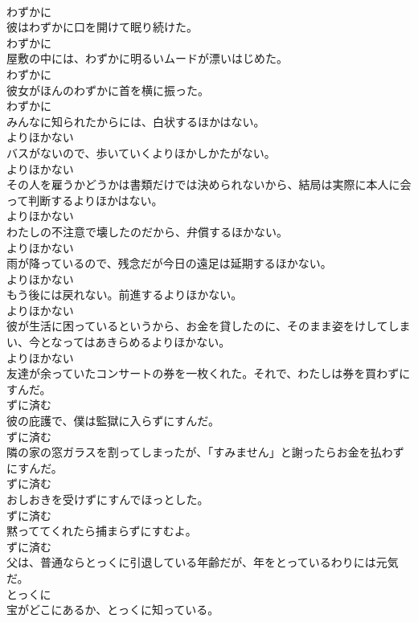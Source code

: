 \documentclass[8pt]{extreport}
\begin{document}
\begin{CJK}{UTF8}{min}
\\	わずかに
\\	彼はわずかに口を開けて眠り続けた。	
\\	わずかに
\\	屋敷の中には、わずかに明るいムードが漂いはじめた。	
\\	わずかに
\\	彼女がほんのわずかに首を横に振った。	
\\	わずかに
\\	みんなに知られたからには、白状するほかはない。	
\\	よりほかない
\\	バスがないので、歩いていくよりほかしかたがない。	
\\	よりほかない
\\	その人を雇うかどうかは書類だけでは決められないから、結局は実際に本人に会って判断するよりほかはない。	
\\	よりほかない
\\	わたしの不注意で壊したのだから、弁償するほかない。	
\\	よりほかない
\\	雨が降っているので、残念だが今日の遠足は延期するほかない。	
\\	よりほかない
\\	もう後には戻れない。前進するよりほかない。	
\\	よりほかない
\\	彼が生活に困っているというから、お金を貸したのに、そのまま姿をけしてしまい、今となってはあきらめるよりほかない。	
\\	よりほかない
\\	友達が余っていたコンサートの券を一枚くれた。それで、わたしは券を買わずにすんだ。	
\\	ずに済む
\\	彼の庇護で、僕は監獄に入らずにすんだ。	
\\	ずに済む
\\	隣の家の窓ガラスを割ってしまったが、「すみません」と謝ったらお金を払わずにすんだ。	
\\	ずに済む
\\	おしおきを受けずにすんでほっとした。	
\\	ずに済む
\\	黙っててくれたら捕まらずにすむよ。	
\\	ずに済む
\\	父は、普通ならとっくに引退している年齢だが、年をとっているわりには元気だ。	
\\	とっくに
\\	宝がどこにあるか、とっくに知っている。	

\end{CJK}
\end{document}
